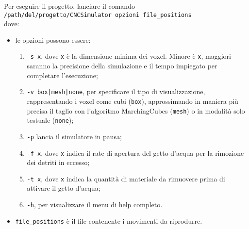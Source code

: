Per eseguire il progetto, lanciare il comando\\ \verb!/path/del/progetto/CNCSimulator opzioni file_positions!\\ dove:
\begin{itemize}
  \item le opzioni possono essere:
    \begin{enumerate}[noitemsep]
      \item \verb!-s x!, dove \verb!x! è la dimensione minima dei voxel. Minore è \verb!x!, maggiori saranno la precisione della simulazione e il tempo impiegato per completare l'esecuzione;
      \item \verb!-v box|mesh|none!, per specificare il tipo di visualizzazione, rappresentando i voxel come cubi (\texttt{box}), approssimando in maniera più precisa il taglio con l'algoritmo MarchingCubes (\texttt{mesh}) o in modalità solo testuale (\texttt{none});
      \item \verb!-p! lancia il simulatore in pausa;
      \item \verb!-f x!, dove \verb!x! indica il rate di apertura del getto d'acqua per la rimozione dei detriti in eccesso;
      \item \verb!-t x!, dove \verb!x! indica la quantità di materiale da rimuovere prima di attivare il getto d'acqua;
      \item \verb!-h!, per visualizzare il menu di help completo.
    \end{enumerate}
  \item \verb!file_positions! è il file contenente i movimenti da riprodurre.
\end{itemize}
